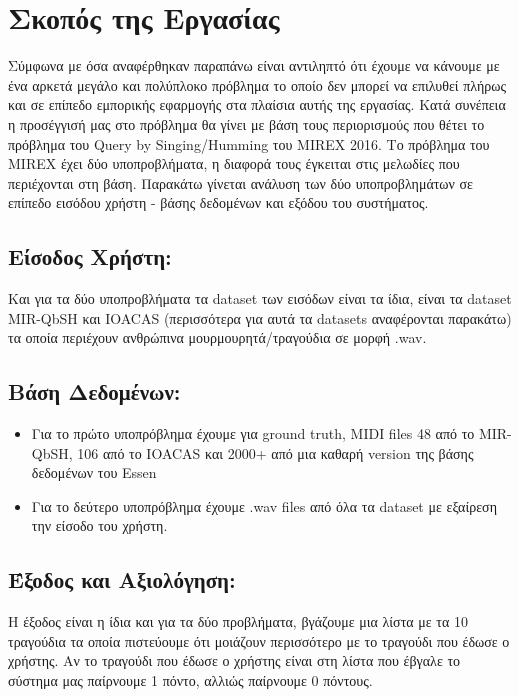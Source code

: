 \section{Σκοπός της Εργασίας}
Σύμφωνα με όσα αναφέρθηκαν παραπάνω είναι αντιληπτό ότι έχουμε να κάνουμε με
ένα αρκετά μεγάλο και πολύπλοκο πρόβλημα το οποίο δεν μπορεί να επιλυθεί πλήρως
και σε επίπεδο εμπορικής εφαρμογής στα πλαίσια αυτής της εργασίας. Κατά συνέπεια
η προσέγγισή μας στο πρόβλημα θα γίνει με βάση τους περιορισμούς που θέτει το
πρόβλημα του Query by Singing/Humming του MIREX 2016\cite{mirex}. Το πρόβλημα
του MIREX έχει δύο υποπροβλήματα, η διαφορά τους έγκειται στις μελωδίες που
περιέχονται στη βάση. Παρακάτω γίνεται ανάλυση των δύο υποπροβλημάτων σε
επίπεδο εισόδου χρήστη - βάσης δεδομένων και εξόδου του συστήματος.

\subsection{Είσοδος Χρήστη:}
Και για τα δύο υποπροβλήματα τα dataset των εισόδων είναι τα ίδια, είναι τα
dataset MIR-QbSH και IOACAS (περισσότερα για αυτά τα datasets αναφέρονται
παρακάτω) τα οποία περιέχουν ανθρώπινα μουρμουρητά/τραγούδια σε μορφή .wav.

\subsection{Βάση Δεδομένων:}
\begin{itemize}
  \item Για το πρώτο υποπρόβλημα έχουμε για ground truth, MIDI files 48 από το
  MIR-QbSH, 106 από το IOACAS και 2000+ από μια καθαρή version της βάσης
  δεδομένων του Essen \cite{esac-dataset}
  \item Για το δεύτερο υποπρόβλημα έχουμε .wav files από όλα τα dataset με
  εξαίρεση την είσοδο του χρήστη.
\end{itemize}


\subsection{Έξοδος και Αξιολόγηση:}
Η έξοδος είναι η ίδια και για τα δύο προβλήματα, βγάζουμε μια λίστα με τα 10
τραγούδια τα οποία πιστεύουμε ότι μοιάζουν περισσότερο με το τραγούδι που έδωσε
ο χρήστης. Αν το τραγούδι που έδωσε ο χρήστης είναι στη λίστα που έβγαλε το
σύστημα μας παίρνουμε 1 πόντο, αλλιώς παίρνουμε 0 πόντους.
